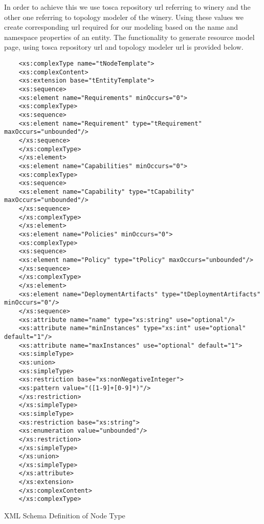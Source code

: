 In order to achieve this we use tosca repository url referring to winery and the other one referring to topology modeler of the winery. Using these values we create corresponding url required for our modeling based on the name and namespace properties of an entity. The functionality to generate resource model page, using tosca repository url and topology modeler url is provided below.

			
\begin{Listing}
	\begin{lstlisting}
	<xs:complexType name="tNodeTemplate">
	<xs:complexContent>
	<xs:extension base="tEntityTemplate">
	<xs:sequence>
	<xs:element name="Requirements" minOccurs="0">
	<xs:complexType>
	<xs:sequence>
	<xs:element name="Requirement" type="tRequirement" maxOccurs="unbounded"/>
	</xs:sequence>
	</xs:complexType>
	</xs:element>
	<xs:element name="Capabilities" minOccurs="0">
	<xs:complexType>
	<xs:sequence>
	<xs:element name="Capability" type="tCapability" maxOccurs="unbounded"/>
	</xs:sequence>
	</xs:complexType>
	</xs:element>
	<xs:element name="Policies" minOccurs="0">
	<xs:complexType>
	<xs:sequence>
	<xs:element name="Policy" type="tPolicy" maxOccurs="unbounded"/>
	</xs:sequence>
	</xs:complexType>
	</xs:element>
	<xs:element name="DeploymentArtifacts" type="tDeploymentArtifacts" minOccurs="0"/>
	</xs:sequence>
	<xs:attribute name="name" type="xs:string" use="optional"/>
	<xs:attribute name="minInstances" type="xs:int" use="optional" default="1"/>
	<xs:attribute name="maxInstances" use="optional" default="1">
	<xs:simpleType>
	<xs:union>
	<xs:simpleType>
	<xs:restriction base="xs:nonNegativeInteger">
	<xs:pattern value="([1-9]+[0-9]*)"/>
	</xs:restriction>
	</xs:simpleType>
	<xs:simpleType>
	<xs:restriction base="xs:string">
	<xs:enumeration value="unbounded"/>
	</xs:restriction>
	</xs:simpleType>
	</xs:union>
	</xs:simpleType>
	</xs:attribute>
	</xs:extension>
	</xs:complexContent>
	</xs:complexType>
	\end{lstlisting}
	\caption{XML Schema Definition of Node Type}
	\label{lst:xsdnodetype}
\end{Listing}
		

